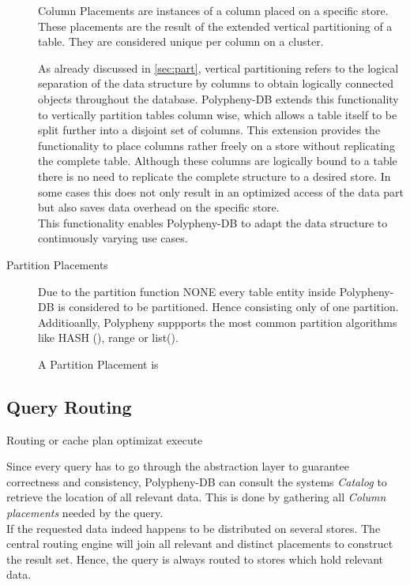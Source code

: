 \begin{description}
    Column Placements are instances of a column placed on a specific store.
    These placements are the result of the extended vertical partitioning of a table.
    They are considered unique per column on a cluster.
    
    As already discussed in \ref{sec:part}, vertical partitioning refers to the logical 
    separation of the data structure by columns to obtain logically connected objects throughout 
    the database. 
    Polypheny-DB extends this functionality to vertically partition tables
    column wise, which allows a table itself to be split further into a disjoint 
    set of columns. This extension provides the functionality to place columns 
    rather freely on a store without replicating the complete table. 
    Although these columns are logically bound to a table there is no need 
    to replicate the complete structure to a desired store. In some cases 
    this does not only result in an optimized access of the data part but 
    also saves data overhead on the specific store.\\
    This functionality enables Polypheny-DB to adapt the data structure to continuously 
    varying use cases.\\

    \item [Partition Placements] Due to the partition function NONE every table entity inside Polypheny-DB is considered to be partitioned.  Hence consisting only of one partition.
    Additioanlly, Polypheny suppports the most common partition algorithms like HASH (), range or list(). 
    
    A Partition Placement is 
\end{description}





\subsection{Query Routing}

Routing or cache plan optimizat execute

Since every query has to go through the abstraction layer to guarantee correctness 
and consistency, Polypheny-DB can consult the systems \textit{Catalog} to retrieve the
location of all relevant data. This is done by gathering all 
\textit{Column placements} needed by the query.\\ 
If the requested data indeed happens to be distributed
on several stores. The central routing engine will join all relevant and distinct 
placements to construct the result set. Hence, the query is always routed to stores which 
hold relevant data.


